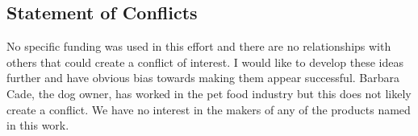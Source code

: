 \clearpage
\appendix

\begin{mdpicomment}

\section{ Statement of Conflicts }
 No specific funding was used in this effort and there are no relationships
with others that could create a conflict of interest. I would like to develop
these ideas further and have obvious bias towards making them appear 
successful. Barbara Cade, the dog owner, has worked in the pet food industry
but this does not likely create a conflict. We have no interest in the
makers of any of the products named in this work.  

\end{mdpicomment}

